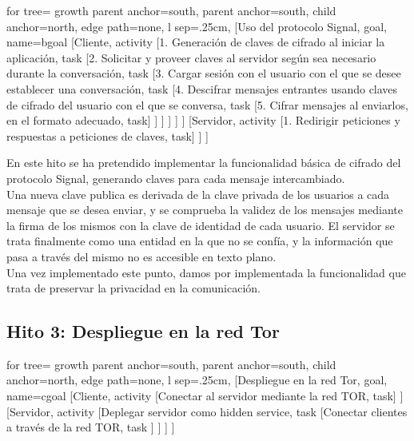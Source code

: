 \begin{adjustbox}{margin=2.5ex 5ex 2.5ex 2.5ex,center}
	\begin{forest} for tree={
			growth parent anchor=south,
			parent anchor=south,
			child anchor=north,
			edge path={none}, 
			l sep=.25cm,
	}   
	[Uso del protocolo Signal, goal, name=bgoal
		[Cliente, activity
		[1. Generación de claves de cifrado al iniciar la aplicación, task
		[2. Solicitar y proveer claves al servidor según sea necesario durante la conversación, task
		[3. Cargar sesión con el usuario con el que se desee establecer una conversación, task
		[4. Descifrar mensajes entrantes usando claves de cifrado del usuario con el que se conversa, task
		[5. Cifrar mensajes al enviarlos{,} en el formato adecuado, task] ] ] ] ] ]
		[Servidor, activity
		[1. Redirigir peticiones y respuestas a peticiones de claves, task] ] ] 
	\end{forest}
\end{adjustbox}

En este hito se ha pretendido implementar la funcionalidad básica de cifrado del protocolo Signal, generando claves para cada mensaje intercambiado. \\

Una nueva clave publica es derivada de la clave privada de los usuarios a cada mensaje que se desea enviar, y se comprueba la validez de los mensajes mediante la firma de los mismos con la clave de identidad de cada usuario.
El servidor se trata finalmente como una entidad en la que no se confía, y la información que pasa a través del mismo no es accesible en texto plano. \\

Una vez implementado este punto, damos por implementada la funcionalidad que trata de preservar la privacidad en la comunicación. \\ 

\subsection{Hito 3: Despliegue en la red Tor}
\begin{adjustbox}{margin=2.5ex 5ex 2.5ex 2.5ex,center}
	\begin{forest} for tree={
			growth parent anchor=south,
			parent anchor=south,
			child anchor=north,
			edge path={none}, 
			l sep=.25cm,
	}   
	[Despliegue en la red Tor, goal, name=cgoal
		[Cliente, activity
		[Conectar al servidor mediante la red TOR, task] ]
		[Servidor, activity
		[Deplegar servidor como hidden service, task
		[Conectar clientes a través de la red TOR, task ] ] ] ] 
	\end{forest}
\end{adjustbox}

